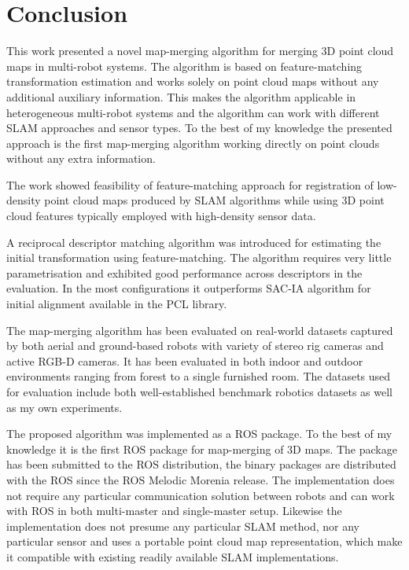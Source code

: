 \chapter*{Conclusion}

This work presented a novel map-merging algorithm for merging \gls{3D} point cloud maps in multi-robot systems. The algorithm is based on feature-matching transformation estimation and works solely on point cloud maps without any additional auxiliary information. This makes the algorithm applicable in heterogeneous multi-robot systems and the algorithm can work with different \gls{SLAM} approaches and sensor types. To the best of my knowledge the presented approach is the first map-merging algorithm working directly on point clouds without any extra information.

The work showed feasibility of feature-matching approach for registration of low-density point cloud maps produced by \gls{SLAM} algorithms while using \gls{3D} point cloud features typically employed with high-density sensor data.

A reciprocal descriptor matching algorithm was introduced for estimating the initial transformation using feature-matching. The algorithm requires very little parametrisation and exhibited good performance across descriptors in the evaluation. In the most configurations it outperforms \gls{SAC-IA} algorithm for initial alignment available in the \gls{PCL} library.

The map-merging algorithm has been evaluated on real-world datasets captured by both aerial and ground-based robots with variety of stereo rig cameras and active \gls{RGB-D} cameras. It has been evaluated in both indoor and outdoor environments ranging from forest to a single furnished room. The datasets used for evaluation include both well-established benchmark robotics datasets as well as my own experiments.

The proposed algorithm was implemented as a \gls{ROS} package. To the best of my knowledge it is the first \gls{ROS} package for map-merging of \gls{3D} maps. The package has been submitted to the \gls{ROS} distribution, the binary packages are distributed with the \gls{ROS} since the \gls{ROS} Melodic Morenia release. The implementation does not require any particular communication solution between robots and can work with \gls{ROS} in both multi-master and single-master setup. Likewise the implementation does not presume any particular \gls{SLAM} method, nor any particular sensor and uses a portable point cloud map representation, which make it compatible with existing readily available \gls{SLAM} implementations.

